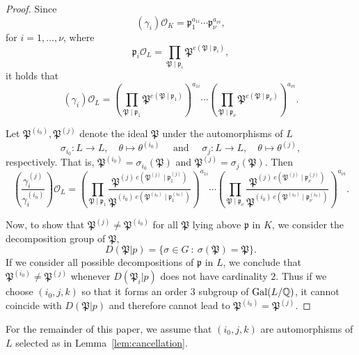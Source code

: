 \begin{proof}
Since 
\[(\gamma_i)\mathcal{O}_K = \mathfrak{p}_1^{a_{1i}} \cdots \mathfrak{p}_{\nu}^{a_{\nu i}},\]
for $i = 1, \dots, \nu$, where
\[\mathfrak{p}_i\mathcal{O}_L=\prod_{\mathfrak{P}\mid\mathfrak{p}_i} \mathfrak{P}^{e(\mathfrak{P}\mid\mathfrak{p}_i)},\]
it holds that
\[(\gamma_i)\mathcal{O}_L = \left(\prod_{\mathfrak{P}\mid\mathfrak{p}_1} \mathfrak{P}^{e(\mathfrak{P}\mid\mathfrak{p}_1)}\right)^{a_{1i}} \cdots \left(\prod_{\mathfrak{P}\mid\mathfrak{p}_{\nu}} \mathfrak{P}^{e(\mathfrak{P}\mid\mathfrak{p}_{\nu})}\right)^{a_{\nu i}}.\]

Let $\mathfrak{P}^{(i_0)},\mathfrak{P}^{(j)}$ denote the ideal $\mathfrak{P}$ under the automorphisms of $L$
\[\sigma_{i_0}: L \to L, \quad \theta \mapsto \theta^{(i_0)} \quad \text{ and } \quad \sigma_{j}: L \to L, \quad \theta \mapsto \theta^{(j)},\]
respectively. That is, $\mathfrak{P}^{(i_0)} = \sigma_{i_0}(\mathfrak{P})$ and $\mathfrak{P}^{(j)} = \sigma_{j}(\mathfrak{P})$. Then
\[\left( \frac{\gamma_i^{(j)}}{\gamma_i^{(i_0)}}\right)\mathcal{O}_L 
	 = \left(\prod_{\mathfrak{P}\mid\mathfrak{p}_1} \frac{\mathfrak{P}^{(j) \ e(\mathfrak{P}^{(j)}\mid\mathfrak{p}_1^{(j)})}}{\mathfrak{P}^{(i_0) \ e(\mathfrak{P}^{(i_0)}\mid\mathfrak{p}^{(i_0)}_1)}}\right)^{a_{1i}} \cdots \left(\prod_{\mathfrak{P}\mid\mathfrak{p}_{\nu}} \frac{\mathfrak{P}^{(j) \ e(\mathfrak{P}^{(j)}\mid\mathfrak{p}^{(j)}_{\nu})}}{\mathfrak{P}^{(i_0) \ e(\mathfrak{P}^{(i_0)}\mid\mathfrak{p}^{(i_0)}_{\nu})}}\right)^{a_{\nu i}}.\]

Now, to show that $\mathfrak{P}^{(j)} \neq \mathfrak{P}^{(i_0)}$ for all $\mathfrak{P}$ lying above $\mathfrak{p}$ in $K$, we consider the decomposition group of $\mathfrak{P}$, 
\[D(\mathfrak{P}|p) = \{\sigma \in G \ : \ \sigma(\mathfrak{P}) = \mathfrak{P}\}.\]
If we consider all possible decompositions of $\mathfrak{p}$ in $L$, we conclude that $\mathfrak{P}^{(i_0)} \neq \mathfrak{P}^{(j)}$ whenever $D(\mathfrak{P}_i|p)$ does not have cardinality $2$. Thus if we choose $(i_0,j,k)$ so that it forms an order $3$ subgroup of $\operatorname{Gal}(L/\mathbb{Q})$, it cannot coincide with $D(\mathfrak{P}|p)$ and therefore cannot lead to $\mathfrak{P}^{(i_0)} = \mathfrak{P}^{(j)}$. 
\end{proof}

For the remainder of this paper, we assume that $(i_0,j,k)$ are automorphisms of $L$ selected as in Lemma~\ref{lem:cancellation}.

